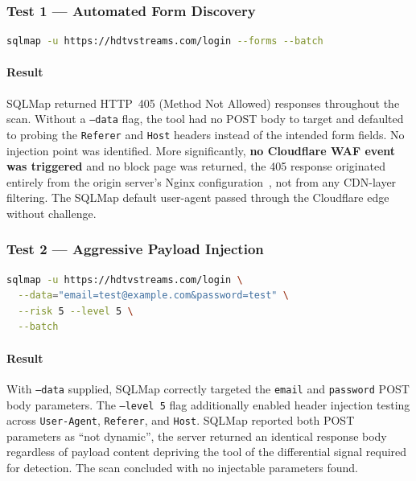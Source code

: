 \documentclass[12pt, a4paper]{report}   %
\begin{document}
\subsubsection{Test 1 --- Automated Form Discovery}

\begin{lstlisting}[language=bash, caption={SQLMap Form Discovery}]
sqlmap -u https://hdtvstreams.com/login --forms --batch
\end{lstlisting}

\paragraph{Result}

SQLMap returned HTTP~405 (Method Not Allowed) responses throughout the scan. Without
a \texttt{--data} flag, the tool had no POST body to target and defaulted to probing
the \texttt{Referer} and \texttt{Host} headers instead of the intended form fields.
No injection point was identified. More significantly, \textbf{no Cloudflare WAF
event was triggered} and no block page was returned, the 405 response originated
entirely from the origin server's Nginx configuration~\cite{nginx-docs}, not from any 
CDN-layer filtering. The SQLMap default user-agent passed through the Cloudflare edge 
without challenge.

\subsubsection{Test 2 --- Aggressive Payload Injection}

\begin{lstlisting}[language=bash, caption={SQLMap Aggressive Test --- Maximum Risk and Level}]
sqlmap -u https://hdtvstreams.com/login \
  --data="email=test@example.com&password=test" \
  --risk 5 --level 5 \
  --batch
\end{lstlisting}

\paragraph{Result}

With \texttt{--data} supplied, SQLMap correctly targeted the \texttt{email} and
\texttt{password} POST body parameters. The \texttt{--level 5} flag additionally
enabled header injection testing across \texttt{User-Agent}, \texttt{Referer}, and
\texttt{Host}. SQLMap reported both POST parameters as ``not dynamic'', the server
returned an identical response body regardless of payload content depriving the
tool of the differential signal required for detection. The scan concluded with no
injectable parameters found.
\end{document}
